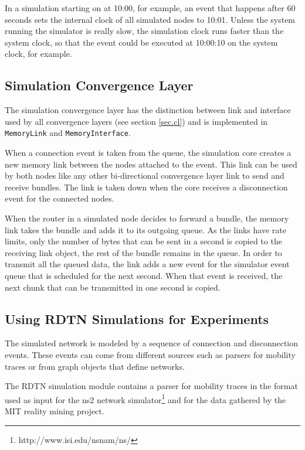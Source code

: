 \documentclass[a4paper]{article}
\begin{document}
In a simulation starting on at 10:00, for example, an event that happens after
60 seconds sets the internal clock of all simulated nodes to 10:01. Unless the
system running the simulator is really slow, the simulation clock runs faster
than the system clock, so that the event could be executed at 10:00:10 on the
system clock, for example.

\subsection{Simulation Convergence Layer}\label{sec.sim.cl}

The simulation convergence layer has the distinction between link and interface
used by all convergence layers (see section \ref{sec.cl}) and is implemented in
{\tt MemoryLink} and {\tt MemoryInterface}.

When a connection event is taken from the queue, the simulation core creates a
new memory link between the nodes attached to the event. This link can be used
by both nodes like any other bi-directional convergence layer link to send and
receive bundles. The link is taken down when the core receives a disconnection
event for the connected nodes.

When the router in a simulated node decides to forward a bundle, the memory link
takes the bundle and adds it to its outgoing queue. As the links have rate
limits, only the number of bytes that can be sent in a second is copied to the
receiving link object, the rest of the bundle remains in the queue. In order to
transmit all the queued data, the link adds a new event for the simulator event
queue that is scheduled for the next second. When that event is received, the
next chunk that can be transmitted in one second is copied.

\subsection{Using RDTN Simulations for Experiments}\label{sec.sim.experiments}

The simulated network is modeled by a sequence of connection and disconnection
events. These events can come from different sources such as parsers for
mobility traces or from graph objects that define networks.

The RDTN simulation module contains a parser for mobility traces in the format
used as input for the ns2 network
simulator\footnote{http://www.isi.edu/nsnam/ns/} and for the data gathered by
the MIT reality mining project.
\end{document}
